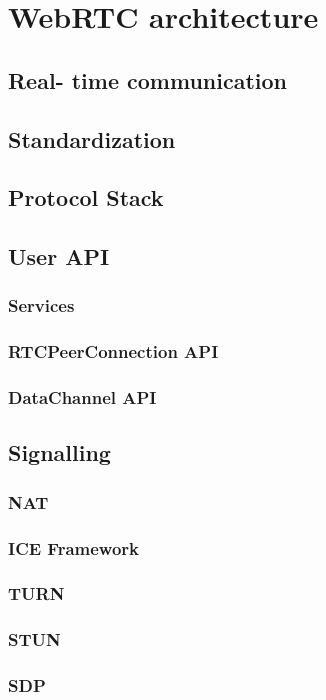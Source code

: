 
\section{WebRTC architecture}
\subsection{Real- time communication}
\subsection{Standardization}
\subsection{Protocol Stack}
\subsection{User API}
\subsubsection{Services}
\subsubsection{RTCPeerConnection API}
\subsubsection{DataChannel API}
\subsection{Signalling}
\subsubsection{NAT}
\subsubsection{ICE Framework}
\subsubsection{TURN}
\subsubsection{STUN}
\subsubsection{SDP}
